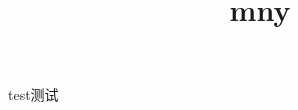 \documentclass{ctexart}
\title{mny}
\author{}
\begin{document}
\maketitle

test测试

\begin{equation}
\end{equation}
\end{document}

